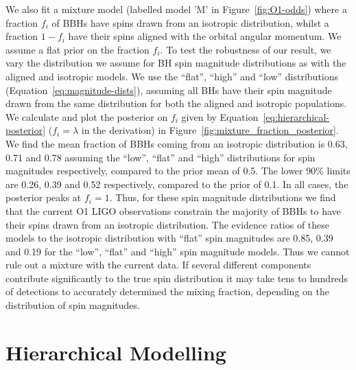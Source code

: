 \documentclass{nature}
\begin{document}
\begin{methods}
We also fit a mixture model\cite{Stevenson:2017spin} (labelled model
'M' in Figure~\ref{fig:O1-odds}) where a fraction $f_i$ of BBHs have
spins drawn from an isotropic distribution, whilst a fraction
$1 - f_i$ have their spins aligned with the orbital angular
momentum. We assume a flat prior on the fraction $f_i$. To test the
robustness of our result, we vary the distribution we assume for BH
spin magnitude distributions as with the aligned and isotropic
models. We use the ``flat'', ``high'' and ``low'' distributions
(Equation~\ref{eq:magnitude-dists}), assuming all BHs have their spin
magnitude drawn from the same distribution for both the aligned and
isotropic populations. We calculate and plot the posterior on $f_i$
given by Equation~\ref{eq:hierarchical-posterior} ($f_i=\lambda$ in
the derivation) in Figure~\ref{fig:mixture_fraction_posterior}. We
find the mean fraction of BBHs coming from an isotropic distribution
is 0.63, 0.71 and 0.78 assuming the ``low'', ``flat'' and ``high''
distributions for spin magnitudes respectively, compared to the prior
mean of 0.5. The lower 90\% limits are 0.26, 0.39 and 0.52
respectively, compared to the prior of 0.1. In all cases, the
posterior peaks at $f_i = 1$. Thus, for these spin magnitude
distributions we find that the current O1 LIGO observations constrain
the majority of BBHs to have their spins drawn from an isotropic
distribution. The evidence ratios of these models to the isotropic
distribution with ``flat'' spin magnitudes are 0.85, 0.39 and 0.19 for
the ``low'', ``flat'' and ``high'' spin magnitude models. Thus we
cannot rule out a mixture with the current data.  If several different
components contribute significantly to the true spin distribution it
may take tens to hundreds of detections to accurately determined the
mixing fraction, depending on the distribution of spin
magnitudes\cite{2017CQGra..34cLT01V,Stevenson:2017spin}.

\section{Hierarchical Modelling} 
\label{sec:hierarchical}


\end{methods}
\end{document}
